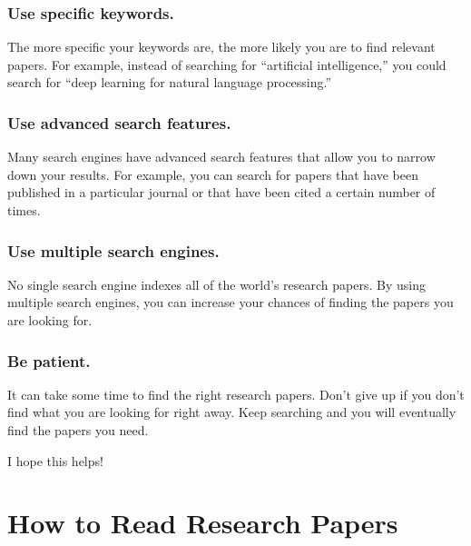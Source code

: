 \documentclass[
  b5paper]{book}
\begin{document}
\hypertarget{use-specific-keywords.}{%
\subsubsection*{Use specific keywords.}\label{use-specific-keywords.}}

The more specific your keywords are, the more likely you are to find relevant papers. For example, instead of searching for ``artificial intelligence,'' you could search for ``deep learning for natural language processing.''

\hypertarget{use-advanced-search-features.}{%
\subsubsection*{Use advanced search features.}\label{use-advanced-search-features.}}

Many search engines have advanced search features that allow you to narrow down your results. For example, you can search for papers that have been published in a particular journal or that have been cited a certain number of times.

\hypertarget{use-multiple-search-engines.}{%
\subsubsection*{Use multiple search engines.}\label{use-multiple-search-engines.}}

No single search engine indexes all of the world's research papers. By using multiple search engines, you can increase your chances of finding the papers you are looking for.

\hypertarget{be-patient.}{%
\subsubsection*{Be patient.}\label{be-patient.}}

It can take some time to find the right research papers. Don't give up if you don't find what you are looking for right away. Keep searching and you will eventually find the papers you need.

I hope this helps!

\hypertarget{read}{%
\section{How to Read Research Papers}\label{read}}
\end{document}
